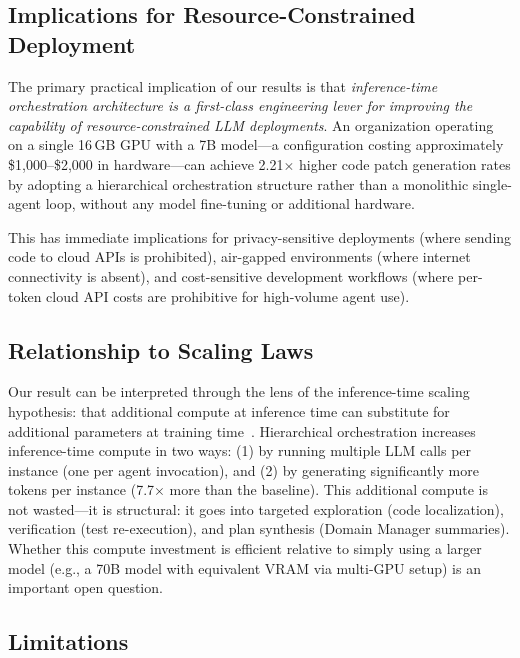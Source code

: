 
\subsection{Implications for Resource-Constrained Deployment}
\label{sec:disc:deployment}

The primary practical implication of our results is that \emph{inference-time
orchestration architecture is a first-class engineering lever for improving
the capability of resource-constrained LLM deployments}. An organization
operating on a single 16\,GB GPU with a 7B model---a configuration costing
approximately \$1{,}000--\$2{,}000 in hardware---can achieve 2.21$\times$
higher code patch generation rates by adopting a hierarchical orchestration
structure rather than a monolithic single-agent loop, without any model
fine-tuning or additional hardware.

This has immediate implications for privacy-sensitive deployments (where
sending code to cloud APIs is prohibited), air-gapped environments (where
internet connectivity is absent), and cost-sensitive development workflows
(where per-token cloud API costs are prohibitive for high-volume agent use).

\subsection{Relationship to Scaling Laws}
\label{sec:disc:scaling}

Our result can be interpreted through the lens of the inference-time scaling
hypothesis: that additional compute at inference time can substitute for
additional parameters at training time~\cite{snell2024scaling,
brown2024large}. Hierarchical orchestration increases inference-time compute
in two ways: (1) by running multiple LLM calls per instance (one per agent
invocation), and (2) by generating significantly more tokens per instance
(7.7$\times$ more than the baseline). This additional compute is not
wasted---it is structural: it goes into targeted exploration (code localization),
verification (test re-execution), and plan synthesis (Domain Manager
summaries). Whether this compute investment is efficient relative to simply
using a larger model (e.g., a 70B model with equivalent VRAM via multi-GPU
setup) is an important open question.

\subsection{Limitations}
\label{sec:disc:limitations}

